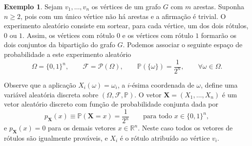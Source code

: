\documentclass[12pt,portuguese]{article}
\theoremstyle{definition}
\newtheorem{example}[example]{Exemplo}
\begin{document}
\begin{example}
\medskip 
Sejam $v_1,\ldots,v_n$ os vértices de um grafo $G$ com $m$ arestas.
%
%
%
%
Suponha
$n\geqslant 2$, pois com um único vértice não há arestas e a afirmação é
trivial. O experimento aleatório consiste em sortear, para cada vértice, um
dos dois rótulos, $0$ ou $1$. Assim, os vértices com rótulo $0$ e os vértices
com rótulo $1$ formarão os dois conjuntos da bipartição do grafo $G$. 
Podemos associar o seguinte espaço de probabilidade a este experimento aleatório
\[
\Omega=\{0,1\}^n,
\qquad
\mathcal{F}=\mathscr{P}(\Omega),
\qquad
\mathbb{P}(\{\omega\})=\frac{1}{2^{n}},\qquad \forall \omega\in\Omega.
\]

Observe que a aplicação $X_i(\omega)=\omega_i$, a $i$-ésima coordenada de $\omega$,
define uma variável aleatória discreta sobre $(\Omega,\mathcal{F},\mathbb{P})$. 
O vetor $\mathbf{X}=(X_1,\ldots,X_n)$ é um vetor aleatório discreto com função
de probabilidade conjunta dada por
\[
p_{\mathbf{X}}(x)\equiv \mathbb{P}(\mathbf{X}=x)=\frac{1}{2^{n}}
\qquad\text{para todo } x\in\{0,1\}^n,
\]
e $p_{\mathbf{X}}(x)=0$ para os demais vetores $x\in\mathbb{R}^n$. 
Neste caso todos os vetores de rótulos são
igualmente prováveis, e $X_i$ é o rótulo atribuído ao vértice $v_i$.


\end{example}
\end{document}

